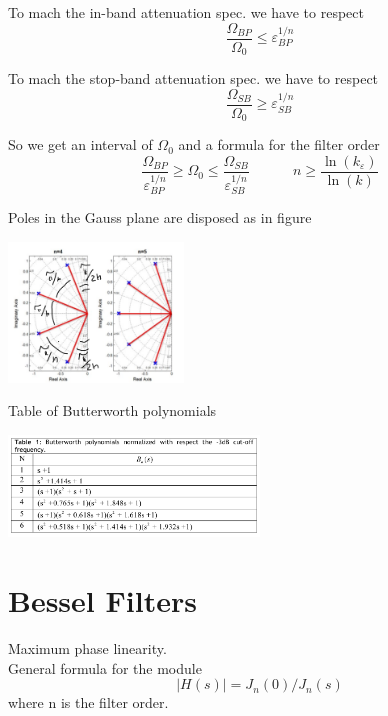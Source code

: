 To mach the in-band attenuation spec. we have to respect
\begin{equation}
\frac{\Omega_{BP}}{\Omega_0}\le \varepsilon_{BP}^{1/n}
\end{equation}

To mach the stop-band attenuation spec. we have to respect
\begin{equation}
\frac{\Omega_{SB}}{\Omega_0}\ge \varepsilon_{SB}^{1/n}
\end{equation}

So we get an interval of $\Omega_0$ and a formula for the filter order
\begin{equation}
\frac{\Omega_{BP}}{\varepsilon_{BP}^{1/n}} \ge \Omega_0 \le \frac{\Omega_{SB}}{\varepsilon_{SB}^{1/n}} \ \ \ \ \ \ \ \ \ \ \ \ \ \ n \ge \frac{\ln(k_{\varepsilon})}{\ln(k)}
\end{equation}

Poles in the Gauss plane are disposed as in figure


\centering
\includegraphics[width=0.35\textwidth]{Gaussbutt.png}\\
\raggedright

Table of Butterworth polynomials

\centering
\includegraphics[width=0.5\textwidth]{butt.png}\\
\raggedright


\section{Bessel Filters}

Maximum phase linearity.\\
General formula for the module 
\begin{equation}
|H(s)|=J_n(0)/J_n(s)
\end{equation}
where n is the filter order.

